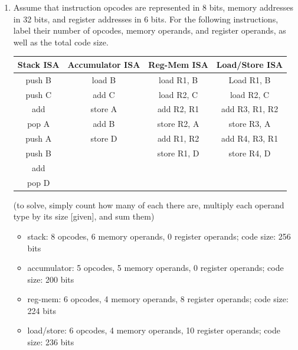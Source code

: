 \documentclass[12pt]{article}
\begin{document}
    \begin{enumerate}
        \item Assume that instruction opcodes are represented in 8 bits, memory addresses in 32 bits, and register 
        addresses in 6 bits. For the following instructions, label their number of opcodes, memory operands, and 
        register operands, as well as the total code size.

        \begin{tabular}[ht!]{|c|c|c|c|} \hline
            Stack ISA   & Accumulator ISA   & Reg-Mem ISA   & Load/Store ISA    \\ \hline
            push B      & load B            & load R1, B    & Load R1, B        \\ \hline
            push C      & add C             & load R2, C    & load R2, C        \\ \hline
            add         & store A           & add R2, R1    & add R3, R1, R2    \\ \hline
            pop A       & add B             & store R2, A   & store R3, A       \\ \hline
            push A      & store D           & add R1, R2    & add R4, R3, R1    \\ \hline
            push B      &                   & store R1, D   & store R4, D       \\ \hline
            add         &                   &               &                   \\ \hline
            pop D       &                   &               &                   \\ \hline
        \end{tabular}

        (to solve, simply count how many of each there are, multiply each operand type by its size [given], and sum them)

        \begin{itemize}
            \item stack: 8 opcodes, 6 memory operands, 0 register operands; code size: 256 bits
            \item accumulator: 5 opcodes, 5 memory operands, 0 register operands; code size: 200 bits
            \item reg-mem: 6 opcodes, 4 memory operands, 8 register operands; code size: 224 bits
            \item load/store: 6 opcodes, 4 memory operands, 10 register operands; code size: 236 bits
        \end{itemize}


\end{enumerate}
\end{document}

